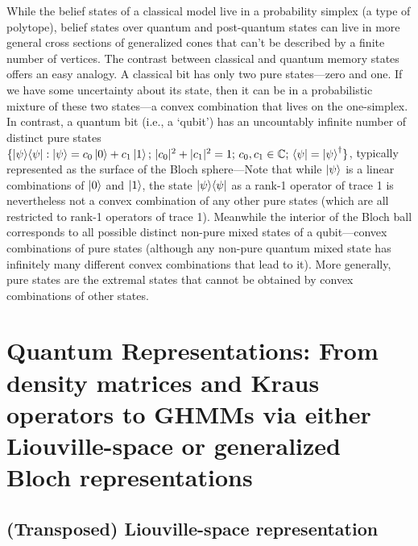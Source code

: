 \documentclass[prx,nofootinbib,onecolumn,showkeys,groupaddress,preprintnumbers,floatfix,
superscriptaddress]{revtex4-1}
\begin{document}
While the belief states of a %
classical model live in a probability simplex (a type of polytope), belief states over quantum and post-quantum states can live in more general cross sections of generalized cones that can't be described by a finite number of vertices.  The contrast between classical and quantum memory states offers an easy analogy.  A classical bit has only two pure states---zero and one.  If we have some uncertainty about its state, then it can be in a probabilistic mixture of these two states---a convex combination that lives on the one-simplex.
In contrast, a quantum bit (i.e., a `qubit') has an uncountably infinite number of distinct pure states $\{ \ket{\psi} \! \bra{\psi} :  \ket{\psi} = c_0 \ket{0} + c_1 \ket{1}; \, |c_0|^2 + |c_1|^2 = 1; \, c_0, c_1 \in \mathbb{C} ; \, \bra{\psi} = \ket{\psi}^\dagger \}$, typically represented as the surface of the Bloch sphere---Note that while $\ket{\psi}$ is a linear combinations of $\ket{0}$ and $\ket{1}$, the state $\ket{\psi} \! \bra{\psi}$ as a rank-1 operator of trace 1 is nevertheless not a convex combination of any other pure states (which are all restricted to rank-1 operators of trace 1).  Meanwhile the interior of the Bloch ball corresponds to all possible distinct non-pure mixed states of a qubit---convex combinations of pure states (although any non-pure quantum mixed state has infinitely many different convex combinations that lead to it).
%
More generally, pure states are the 
extremal states that 
cannot be obtained by convex combinations of other states.  %
%


\section{Quantum Representations: From density matrices and Kraus operators to GHMMs via either Liouville-space or generalized Bloch representations}
\label{sec:QuantumBlochRep}

\subsection{(Transposed) Liouville-space representation}
\end{document}
